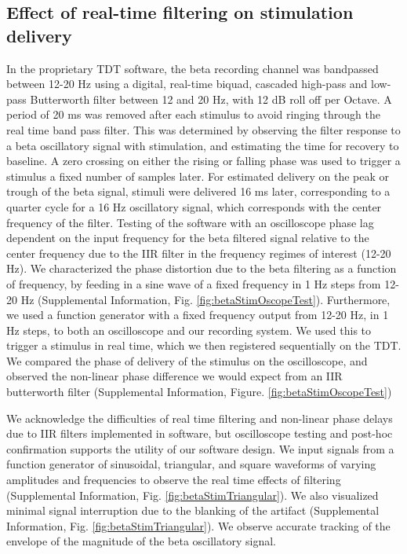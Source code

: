 \subsection{Effect of real-time filtering on stimulation delivery}
In the proprietary TDT software, the beta recording channel was bandpassed between 12-20 Hz using a digital, real-time biquad, cascaded high-pass and low-pass Butterworth filter between 12 and 20 Hz, with 12 dB roll off per Octave. A period of 20 ms was removed after each stimulus to avoid ringing through the real time band pass filter. This was determined by observing the filter response to a beta oscillatory signal with stimulation, and estimating the time for recovery to baseline. A zero crossing on either the rising or falling phase was used to trigger a stimulus a fixed number of samples later. For estimated delivery on the peak or trough of the beta signal, stimuli were delivered 16 ms later, corresponding to a quarter cycle for a 16 Hz oscillatory signal, which corresponds with the center frequency of the filter. Testing of the software with an oscilloscope phase lag dependent on the input frequency for the beta filtered signal relative to the center frequency due to the IIR filter in the frequency regimes of interest (12-20 Hz). We characterized the phase distortion due to the beta filtering as a function of frequency, by feeding in a sine wave of a fixed frequency in 1 Hz steps from 12-20 Hz (Supplemental Information, Fig. \ref{fig:betaStimOscopeTest}). Furthermore, we used a function generator with a fixed frequency output from 12-20 Hz, in 1 Hz steps, to both an oscilloscope and our recording system. We used this to trigger a stimulus in real time, which we then registered sequentially on the TDT. We compared the phase of delivery of the stimulus on the oscilloscope, and observed the non-linear phase difference we would expect from an IIR butterworth filter (Supplemental Information, Figure. \ref{fig:betaStimOscopeTest})

We acknowledge the difficulties of real time filtering and non-linear phase delays due to IIR filters implemented in software, but oscilloscope testing and post-hoc confirmation supports the utility of our software design. We input signals from a function generator of sinusoidal, triangular, and square waveforms of varying amplitudes and frequencies to observe the real time effects of filtering (Supplemental Information, Fig. \ref{fig:betaStimTriangular}). We also visualized minimal signal interruption due to the blanking of the artifact (Supplemental Information, Fig. \ref{fig:betaStimTriangular}). We observe accurate tracking of the envelope of the magnitude of the beta oscillatory signal. 

